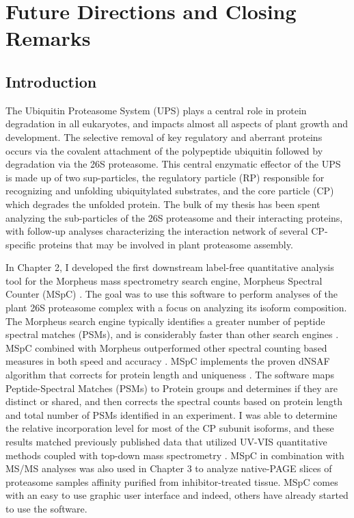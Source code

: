 \chapter{Future Directions and Closing Remarks }

\setcounter{table}{0}
\renewcommand{\thetable}{4.\arabic{table}}
\setcounter{figure}{0}
\renewcommand{\thefigure}{4.\arabic{figure}}


\section{Introduction}
	The Ubiquitin Proteasome System (UPS) plays a central role in protein degradation in all eukaryotes, and impacts almost all aspects of plant growth and development. The selective removal of key regulatory and aberrant proteins occurs via the covalent attachment of the polypeptide ubiquitin followed by degradation via the 26S proteasome.  This central enzymatic effector of the UPS is made up of two sup-particles, the regulatory particle (RP) responsible for recognizing and unfolding ubiquitylated substrates, and the core particle (CP) which degrades the unfolded protein. The bulk of my thesis has been spent analyzing the sub-particles of the 26S proteasome and their interacting proteins, with follow-up analyses characterizing the interaction network of several CP-specific proteins that may be involved in plant proteasome assembly. 
	
	In Chapter 2, I developed the first downstream label-free quantitative analysis tool for the Morpheus mass spectrometry search engine, Morpheus Spectral Counter (MSpC) \citep{gemperline16}. The goal was to use this software to perform analyses of the plant 26S proteasome complex with a focus on analyzing its isoform composition. The Morpheus search engine typically identifies a greater number of peptide spectral matches (PSMs), and is considerably faster than other search engines \citep{wenger13}. MSpC combined with Morpheus outperformed other spectral counting based measures in both speed and accuracy \citep{gemperline16}. MSpC implements the proven dNSAF algorithm that corrects for protein length and uniqueness \citep{zhang10}. The software maps Peptide-Spectral Matches (PSMs) to Protein groups and determines if they are distinct or shared, and then corrects the spectral counts based on protein length and total number of PSMs identified in an experiment. I was able to determine the relative incorporation level for most of the CP subunit isoforms, and these results matched previously published data that utilized UV-VIS quantitative methods coupled with top-down mass spectrometry \citep{gemperline16, russell13}. MSpC in combination with MS/MS analyses was also used in Chapter 3 to analyze native-PAGE slices of proteasome samples affinity purified from inhibitor-treated tissue.  MSpC comes with an easy to use graphic user interface and indeed, others have already started to use the software. 

